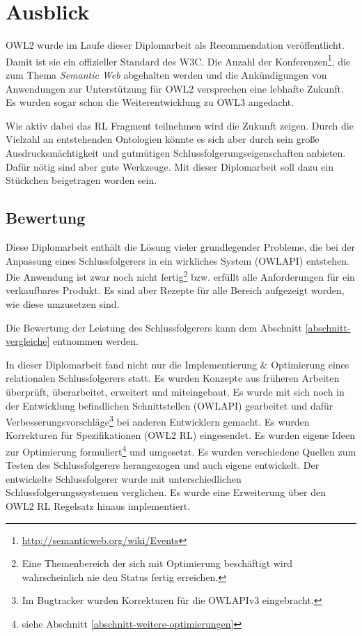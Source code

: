 \chapter{Ausblick}
\label{kapitel-ausblick}
OWL2 wurde im Laufe dieser Diplomarbeit als Recommendation veröffentlicht. Damit ist sie ein offizieller Standard des W3C. Die Anzahl der Konferenzen\footnote{\url{http://semanticweb.org/wiki/Events}}, die zum Thema \emph{Semantic Web} abgehalten werden und die Ankündigungen von Anwendungen zur Unterstützung für OWL2 versprechen eine lebhafte Zukunft. Es wurden sogar schon die Weiterentwicklung zu OWL3 \cite{Hitzler2009} angedacht.

Wie aktiv dabei das RL Fragment teilnehmen wird die Zukunft zeigen. Durch die Vielzahl an entstehenden Ontologien könnte es sich aber durch sein große Ausdrucksmächtigkeit und gutmütigen Schlussfolgerungseigenschaften anbieten. Dafür nötig sind aber gute Werkzeuge. Mit dieser Diplomarbeit soll dazu ein Stückchen beigetragen worden sein.

\section{Bewertung}
Diese Diplomarbeit enthält die Lösung vieler grundlegender Probleme, die bei der Anpassung eines Schlussfolgerers in ein wirkliches System (OWLAPI) entstehen. Die Anwendung ist zwar noch nicht fertig\footnote{Eine Themenbereich der sich mit Optimierung beschäftigt wird wahrscheinlich nie den Status fertig erreichen.} bzw. erfüllt alle Anforderungen für ein verkaufbares Produkt. Es sind aber Rezepte für alle Bereich aufgezeigt worden, wie diese umzusetzen sind.

Die Bewertung der Leistung des Schlussfolgerers kann dem Abschnitt \ref{abschnitt-vergleiche} entnommen werden.

In dieser Diplomarbeit fand nicht nur die Implementierung \& Optimierung eines relationalen Schlussfolgerers statt. Es wurden Konzepte aus früheren Arbeiten überprüft, überarbeitet, erweitert und miteingebaut. Es wurde mit sich noch in der Entwicklung befindlichen Schnittstellen (OWLAPI) gearbeitet und dafür Verbesserungsvorschläge\footnote{Im Bugtracker wurden Korrekturen für die OWLAPIv3 eingebracht.} bei anderen Entwicklern gemacht. Es wurden Korrekturen für Spezifikationen (OWL2 RL) eingesendet. Es wurden eigene Ideen zur Optimierung formuliert\footnote{siehe Abschnitt \ref{abschnitt-weitere-optimierungen}} und umgesetzt. Es wurden verschiedene Quellen zum Testen des Schlussfolgerers herangezogen und auch eigene entwickelt. Der entwickelte Schlussfolgerer wurde mit unterschiedlichen Schlussfolgerungssystemen verglichen. Es wurde eine Erweiterung über den OWL2 RL Regelsatz hinaus implementiert.

